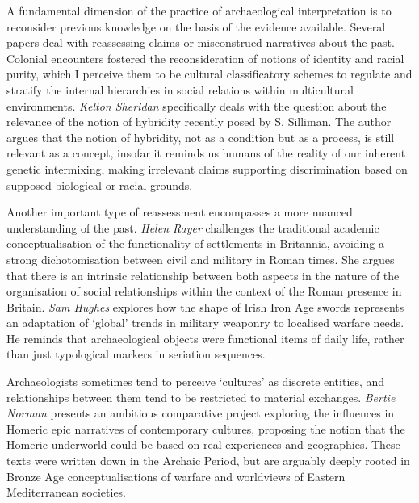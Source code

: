 A fundamental dimension of the practice of archaeological interpretation is to reconsider previous knowledge on the basis of the evidence available. Several papers deal with reassessing claims or misconstrued narratives about the past. Colonial encounters fostered the reconsideration of notions of identity and racial purity, which I perceive them to be cultural classificatory schemes to regulate and stratify the internal hierarchies in social relations within multicultural environments. \emph{Kelton Sheridan} specifically deals with the question about the relevance of the notion of hybridity recently posed by S. Silliman. The author argues that the notion of hybridity, not as a condition but as a process, is still relevant as a concept, insofar it reminds us humans of the reality of our inherent genetic intermixing, making irrelevant claims supporting discrimination based on supposed biological or racial grounds.
		 
Another important type of reassessment encompasses a more nuanced understanding of the past. \emph{Helen Rayer} challenges the traditional academic conceptualisation of the functionality of settlements in Britannia, avoiding a strong dichotomisation between civil and military in Roman times. She argues that there is an intrinsic relationship between both aspects in the nature of the organisation of social relationships within the context of the Roman presence in Britain. \emph{Sam Hughes} explores how the shape of Irish Iron Age swords represents an adaptation of ‘global’ trends in military weaponry to localised warfare needs. He reminds that archaeological objects were functional items of daily life, rather than just typological markers in seriation sequences.
		 
Archaeologists sometimes tend to perceive ‘cultures’ as discrete entities, and relationships between them tend to be restricted to material exchanges. \emph{Bertie Norman} presents an ambitious comparative project exploring the influences in Homeric epic narratives of contemporary cultures, proposing the notion that the Homeric underworld could be based on real experiences and geographies. These texts were written down in the Archaic Period, but are arguably deeply rooted in Bronze Age conceptualisations of warfare and worldviews of Eastern Mediterranean societies.
		 
